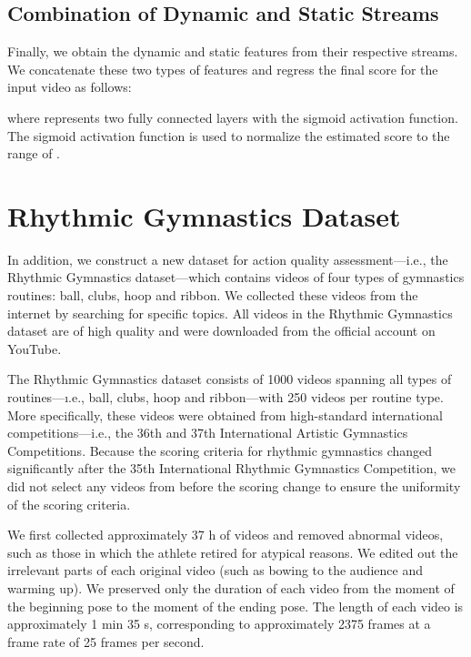 \documentclass[sigconf]{acmart}
\begin{document}
\vspace{-0.1cm}
\subsection{Combination of Dynamic and Static Streams}
Finally, we obtain the dynamic and static features from their respective streams. We concatenate these two types of features and regress the final score for the input video as follows:

where  represents two fully connected layers with the sigmoid activation function. The sigmoid activation function is used to normalize the estimated score to the range of .

\vspace{-0.1cm}
\section{Rhythmic Gymnastics Dataset}


In addition, we construct a new dataset for action quality assessment---i.e., the Rhythmic Gymnastics dataset---which contains videos of four types of gymnastics routines: ball, clubs, hoop and ribbon. We collected these videos from the internet by searching for specific topics. All videos in the Rhythmic Gymnastics dataset are of high quality and were downloaded from the official account on YouTube.

The Rhythmic Gymnastics dataset consists of 1000 videos spanning all types of routines---\i.e., ball, clubs, hoop and ribbon---with 250 videos per routine type. More specifically, these videos were obtained from high-standard international competitions---i.e., the 36th and 37th International Artistic Gymnastics Competitions. Because the scoring criteria for rhythmic gymnastics changed significantly after the 35th International Rhythmic Gymnastics Competition, we did not select any videos from before the scoring change to ensure the uniformity of the scoring criteria. 

\vspace{5pt}

 We first collected approximately 37 h of videos and removed abnormal videos, such as those in which the athlete retired for atypical reasons. We edited out the irrelevant parts of each original video (such as bowing to the audience and warming up). We preserved only the duration of each video from the moment of the beginning pose to the moment of the ending pose. The length of each video is approximately 1 min 35 s, corresponding to approximately 2375 frames at a frame rate of 25 frames per second.
\end{document}
